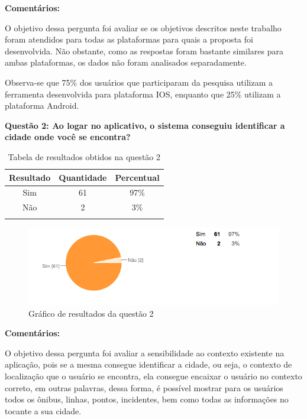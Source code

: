 \textbf{Comentários:}

O objetivo dessa pergunta foi avaliar se os objetivos descritos neste trabalho foram atendidos para todas as plataformas para quais a proposta foi desenvolvida. Não obstante, como as respostas foram bastante similares para ambas plataformas, os dados não foram analisados separadamente. 

Observa-se que 75\% dos usuários que participaram da pesquisa utilizam a ferramenta desenvolvida para plataforma IOS, enquanto que 25\% utilizam a plataforma Android.\newline

\textbf{Questão 2: Ao logar no aplicativo, o sistema conseguiu identificar a cidade onde você se encontra?}

\begin{center}
\begin{longtable}{c|c|c}
\hline
    \multicolumn{1}{c}{\textbf{Resultado}} & \multicolumn{1}{c}{\textbf{Quantidade}} & \multicolumn{1}{c}{\textbf{Percentual}} \\
\hline
    Sim & 61 &  97\%\\
    \hline
    Não & 2 & 3\%\\
    \hline
\caption{Tabela de resultados obtidos na questão 2}
\end{longtable}
\end{center}


\begin{figure}[h]
\begin{center}
  \includegraphics[width=15cm]{images/graficos/questao2.png}
  \caption{Gráfico de resultados da questão 2}
  \label{fig:questao1}
\end{center}
\end{figure}

\textbf{Comentários:}

O objetivo dessa pergunta foi avaliar a sensibilidade ao contexto existente na aplicação, pois se a mesma consegue identificar a cidade, ou seja, o contexto de localização que o usuário se encontra, ela consegue encaixar o usuário no contexto correto, em outras palavras, dessa forma, é possível mostrar para os usuários todos os ônibus, linhas, pontos, incidentes, bem como todas as informações no tocante a sua cidade.
	
